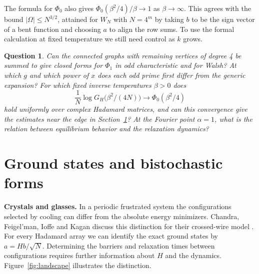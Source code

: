 \documentclass[11pt,a4paper]{article}
\newtheorem{question}[thm]{Question}
\theoremstyle{remark}
\begin{document}
The formula for $\Phi_0$ also gives
$\Phi_0(\beta^2/4)/\beta\to1$ as $\beta\to\infty$. This agrees with the
bound $|\Omega|\leq N^{3/2}$, attained for $W_N$ with $N=4^m$ by taking
$b$ to be the sign vector of a bent function \cite{rot} and choosing
$a$ to align the row sums. To use the formal calculation at fixed
temperature we still need control as $k$ grows.

\begin{samepage}
\begin{question}\label{que:free}
Can the connected graphs with remaining vertices of degree 4 be summed
to give closed forms for $\Phi_1$ in odd characteristic and for Walsh?
At which $g$ and which power of $x$ does each odd prime first differ from
the generic expansion? For which fixed inverse temperatures $\beta>0$ does
\[
 \frac1N\log G_H\big(\beta^2/(4N)\big)\longrightarrow\Phi_0(\beta^2/4)
\]
hold uniformly over complex Hadamard matrices, and can this convergence
give the estimates near the edge in Section~\ref{sec:edge}? At the Fourier point $\alpha=1$, what is the relation between equilibrium behavior and the relaxation dynamics?
\end{question}
\end{samepage}

\section{Ground states and bistochastic forms}\label{sec:edge}

\noindent\textbf{Crystals and glasses.}
In a periodic frustrated system the configurations selected by cooling can differ from the absolute energy minimizers. Chandra, Feigel'man, Ioffe and Kagan discuss this distinction for their crossed-wire model \cite{cfk}. For every Hadamard array we can identify the exact ground states by $a=Hb/\sqrt N$. Determining the barriers and relaxation times between configurations requires further information about $H$ and the dynamics. Figure~\ref{fig:landscape} illustrates the distinction.
\end{document}
